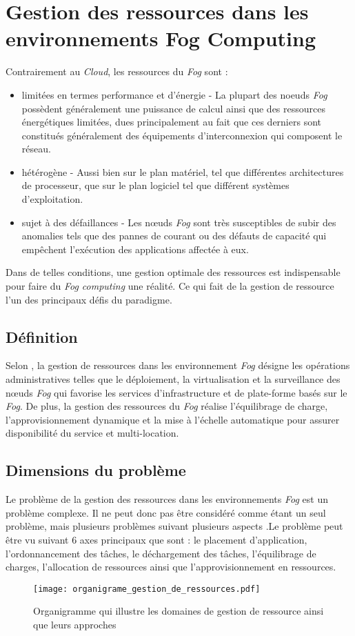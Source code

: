 \section{Gestion des ressources dans les environnements Fog Computing}
Contrairement au \emph{Cloud}, les ressources du \emph{Fog} sont : 
\begin{itemize}
  \item limitées en termes performance et d'énergie - La plupart des noeuds \emph{Fog} possèdent généralement une  puissance de calcul ainsi que des ressources énergétiques limitées, dues principalement au fait que ces derniers sont constitués généralement des équipements d’interconnexion qui composent le réseau.
  \item hétérogène - Aussi bien sur le plan matériel, tel que différentes architectures de processeur, que sur le plan logiciel tel que différent systèmes d’exploitation.
  \item sujet à des défaillances - Les nœuds \emph{Fog} sont très susceptibles de subir des anomalies tels que des pannes de courant ou des défauts de capacité qui empêchent l'exécution des applications affectée à eux.
\end{itemize}
Dans de telles conditions, une gestion optimale des ressources est indispensable pour faire du \emph{Fog computing} une réalité. Ce qui fait de la gestion de ressource l’un des principaux défis du paradigme.
\subsection{Définition}
Selon \cite{red2020}, la gestion de ressources dans les environnement \emph{Fog} désigne \og{}les opérations administratives telles que le déploiement, la virtualisation et la surveillance des nœuds \emph{Fog} qui favorise les services d'infrastructure et de plate-forme basés sur le \emph{Fog}. De plus, la gestion des ressources du \emph{Fog} réalise l'équilibrage de charge, l'approvisionnement dynamique et la mise à l'échelle automatique pour assurer disponibilité du service et multi-location\fg{}.
\subsection{Dimensions du problème}
Le problème de la gestion des ressources dans les environnements \emph{Fog} est un problème complexe. Il ne peut donc pas être considéré comme étant un seul problème, mais plusieurs problèmes suivant plusieurs aspects
\cite{mos2019}.Le problème peut être vu suivant  6 axes principaux que sont : le placement d’application, l’ordonnancement des tâches, le déchargement des tâches, l’équilibrage de charges, l’allocation de ressources ainsi que l'approvisionnement en ressources.
\begin{figure}[H]
  \centering
  \texttt{[image: organigrame\_gestion\_de\_ressources.pdf]}
  \caption{Organigramme qui illustre les domaines de gestion de ressource ainsi que leurs approches}
  \label{fig:organigrame_de_gestion_de_ressources}
  \end{figure}
